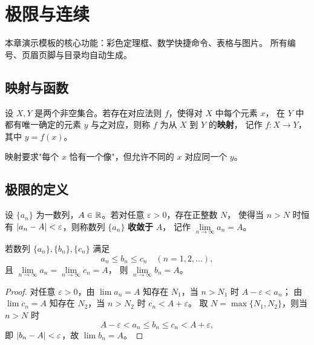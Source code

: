 \documentclass[12pt, a4paper, oneside, UTF8]{ctexbook}
\begin{document}
\else
\fi

\chapter{极限与连续}

本章演示模板的核心功能：彩色定理框、数学快捷命令、表格与图片。
所有编号、页眉页脚与目录均自动生成。

\section{映射与函数}

\begin{definition}[映射]
  设 $X,Y$ 是两个非空集合。若存在对应法则 $f$，使得对 $X$ 中每个元素 $x$，
  在 $Y$ 中都有唯一确定的元素 $y$ 与之对应，则称 $f$ 为从 $X$ 到 $Y$ 的\textbf{映射}，
  记作 $f:X\to Y$，其中 $y=f(x)$。
\end{definition}

\begin{remark}
   映射要求"每个 $x$ 恰有一个像"，但允许不同的 $x$ 对应同一个 $y$。
\end{remark}

\section{极限的定义}

\begin{definition}[数列极限]
  设 $\{a_n\}$ 为一数列，$A\in\mathbb{R}$。若对任意 $\varepsilon>0$，存在正整数 $N$，
  使得当 $n>N$ 时恒有 $\left\lvert a_n-A \right\rvert<\varepsilon$，则称数列 $\{a_n\}$ \textbf{收敛于} $A$，
  记作 $\lim\limits_{n\to\infty}a_n=A$。
\end{definition}

\begin{theorem}[夹逼准则]
  若数列 $\{a_n\},\{b_n\},\{c_n\}$ 满足
  \[
    a_n\le b_n\le c_n \quad (n=1,2,\dots),
  \]
  且 $\lim\limits_{n\to\infty}a_n=\lim\limits_{n\to\infty}c_n=A$，
  则 $\lim\limits_{n\to\infty}b_n=A$。\label{thm:squeeze}
\end{theorem}

\begin{proof}
  对任意 $\varepsilon>0$，由 $\lim a_n=A$ 知存在 $N_1$，当 $n>N_1$ 时 $A-\varepsilon<a_n$；
  由 $\lim c_n=A$ 知存在 $N_2$，当 $n>N_2$ 时 $c_n<A+\varepsilon$。
  取 $N=\max\{N_1,N_2\}$，则当 $n>N$ 时
  \[
    A-\varepsilon<a_n\le b_n\le c_n<A+\varepsilon,
  \]
  即 $\left\lvert b_n-A \right\rvert<\varepsilon$，故 $\lim b_n=A$。\qedhere
\end{proof}
\end{document}

